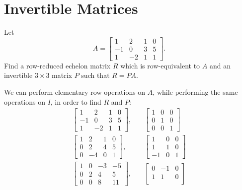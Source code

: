 \section{Invertible Matrices}

\label{eq:lin-eq:inv:R-eq-P-A}
Let
\begin{equation*}
  A =
  \begin{bmatrix}
    1 & 2 & 1 & 0 \\
    -1 & 0 & 3 & 5 \\
    1 & -2 & 1 & 1
  \end{bmatrix}.
\end{equation*}
Find a row-reduced echelon matrix $R$ which is row-equivalent to $A$
and an invertible $3\times3$ matrix $P$ such that $R = PA$.
\begin{solution}
  We can perform elementary row operations on $A$, while performing
  the same operations on $I$, in order to find $R$ and $P$:
  \begin{align*}
    \begin{bmatrix}
      1 & 2 & 1 & 0 \\
      -1 & 0 & 3 & 5 \\
      1 & -2 & 1 & 1
    \end{bmatrix},
    &\quad
    \begin{bmatrix}
      1 & 0 & 0 \\
      0 & 1 & 0 \\
      0 & 0 & 1
    \end{bmatrix} \\
    \begin{bmatrix}
      1 & 2 & 1 & 0 \\
      0 & 2 & 4 & 5 \\
      0 & -4 & 0 & 1
    \end{bmatrix},
    &\quad
    \begin{bmatrix}
      1 & 0 & 0 \\
      1 & 1 & 0 \\
      -1 & 0 & 1
    \end{bmatrix} \\
    \begin{bmatrix}
      1 & 0 & -3 & -5 \\
      0 & 2 & 4 & 5 \\
      0 & 0 & 8 & 11
    \end{bmatrix},
    &\quad
    \begin{bmatrix}
      0 & -1 & 0 \\
      1 & 1 & 0 \\

\end{bmatrix}
\end{align*}
\end{solution}
